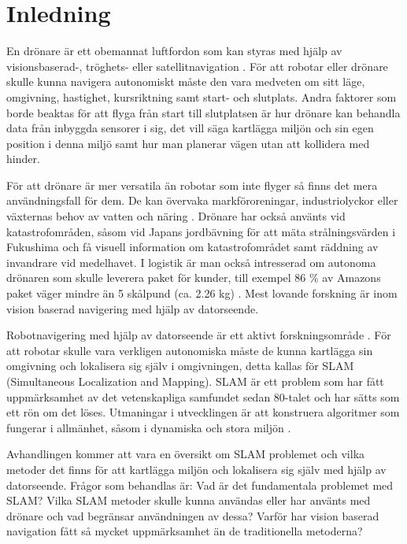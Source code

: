 \chapter{Inledning}

En drönare är ett obemannat luftfordon som kan styras med hjälp av visionsbaserad-, tröghets- eller satellitnavigation \citep{geospatial}. För att robotar eller drönare skulle kunna navigera autonomiskt måste den vara medveten om sitt läge, omgivning, hastighet, kursriktning samt start- och slutplats. Andra faktorer som borde beaktas för att flyga från start till slutplatsen är hur drönare kan behandla data från inbyggda sensorer i sig, det vill säga kartlägga miljön och sin egen position i denna miljö samt hur man planerar vägen utan att kollidera med hinder.

För att drönare är mer versatila än robotar som inte flyger så finns det mera användningsfall för dem. De kan övervaka markföroreningar, industriolyckor eller växternas behov av vatten och näring \citep{crowdsurveillance}. Drönare har också använts vid katastrofområden, såsom vid Japans jordbävning för att mäta strålningsvärden i Fukushima och få visuell information om katastrofområdet samt räddning av invandrare vid medelhavet. I logistik är man också intresserad om autonoma drönaren som skulle leverera paket för kunder, till exempel 86 \% av Amazons paket väger mindre än 5 skålpund (ca. 2.26 kg) \citep{cbsnews}. Mest lovande forskning är inom vision baserad navigering med hjälp av datorseende.

Robotnavigering med hjälp av datorseende är ett aktivt forskningsområde \citep{982903}. För att robotar skulle vara verkligen autonomiska måste de kunna kartlägga sin omgivning och lokalisera sig själv i omgivningen, detta kallas för SLAM (Simultaneous Localization and Mapping). SLAM är ett problem som har fått uppmärksamhet av det vetenskapliga samfundet sedan 80-talet och har sätts som ett rön om det löses. Utmaningar i utvecklingen är att konstruera algoritmer som fungerar i allmänhet, såsom i dynamiska och stora miljön \citep{realslamproblem}.

Avhandlingen kommer att vara en översikt om SLAM problemet och vilka metoder det finns för att kartlägga miljön och lokalisera sig själv med hjälp av datorseende. Frågor som behandlas är: Vad är det fundamentala problemet med SLAM? Vilka SLAM metoder skulle kunna användas eller har använts med drönare och vad begränsar användningen av dessa? Varför har vision baserad navigation fått så mycket uppmärksamhet än de traditionella metoderna?


